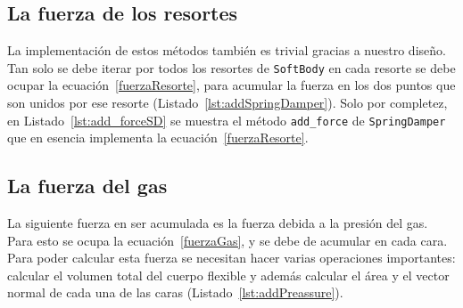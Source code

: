 \subsection{La fuerza de los resortes}

La implementación de estos métodos también es trivial gracias a nuestro diseño.
Tan solo se debe iterar por todos los resortes de \texttt{SoftBody} en cada resorte se debe ocupar la ecuación~\eqref{fuerzaResorte}, para acumular la fuerza en los dos puntos que son unidos por ese resorte (Listado~\ref{lst:addSpringDamper}).
Solo por completez, en Listado~\ref{lst:add_forceSD} se muestra el método \texttt{add_force} de \texttt{SpringDamper} que en esencia implementa la ecuación~\eqref{fuerzaResorte}.



\subsection{La fuerza del gas}
\label{sec:fuerzaGas}

La siguiente fuerza en ser acumulada es la fuerza debida a la presión del gas. Para esto se ocupa la ecuación~\eqref{fuerzaGas}, y se debe de acumular en cada cara.
Para poder calcular esta fuerza se necesitan hacer varias operaciones importantes: calcular el volumen total del cuerpo flexible y además calcular el área y el vector normal de cada una de las caras (Listado~\ref{lst:addPreassure}).


